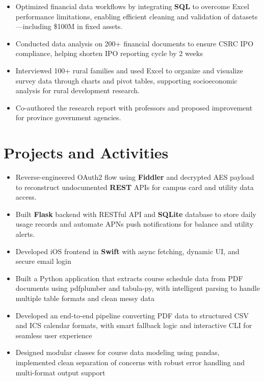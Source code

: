 \documentclass{resume}
\begin{document}
\begin{itemize}
  \item Optimized financial data workflows by integrating \textbf{SQL} to overcome Excel performance limitations, enabling efficient cleaning and validation of datasets—including \$100M in fixed assets.
  \item Conducted data analysis on 200+ financial documents to ensure CSRC IPO compliance, helping shorten IPO reporting cycle by 2 weeks
\end{itemize}

\begin{itemize}
  \item Interviewed 100+ rural families and used Excel to organize and visualize survey data through charts and pivot tables, supporting socioeconomic analysis for rural development research.
  \item Co-authored the research report with professors and proposed improvement for province government agencies.
\end{itemize}


\section{Projects and Activities}
\begin{itemize}
  \item Reverse-engineered OAuth2 flow using \textbf{Fiddler} and decrypted AES payload to reconstruct undocumented \textbf{REST} APIs for campus card and utility data access.
  \item Built \textbf{Flask} backend with RESTful API and \textbf{SQLite} database to store daily usage records and automate APNs push notifications for balance and utility alerts.
  \item Developed iOS frontend in \textbf{Swift} with async fetching, dynamic UI, and secure email login%
\end{itemize}

\begin{itemize}
  \item Built a Python application that extracts course schedule data from PDF documents using pdfplumber and tabula-py, with intelligent parsing to handle multiple table formats and clean messy data
  \item Developed an end-to-end pipeline converting PDF data to structured CSV and ICS calendar formats, with smart fallback logic and interactive CLI for seamless user experience
  \item Designed modular classes for course data modeling using pandas, implemented clean separation of concerns with robust error handling and multi-format output support
\end{itemize}
\end{document}
